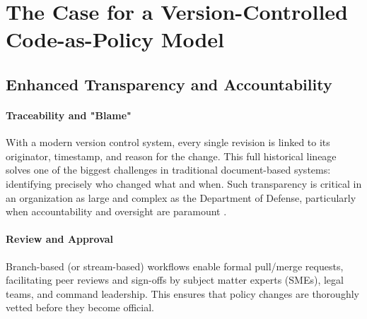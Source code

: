 \documentclass[11pt]{article}
\begin{document}
	\section{The Case for a Version-Controlled Code-as-Policy Model}

	\subsection{Enhanced Transparency and Accountability}

	\paragraph{Traceability and "Blame"}
	With a modern version control system, every single revision is linked to its originator, timestamp, and reason for the change. This full historical lineage solves one of the biggest challenges in traditional document-based systems: identifying precisely who changed what and when. Such transparency is critical in an organization as large and complex as the Department of Defense, particularly when accountability and oversight are paramount \cite{DoDDirective5100.01}.

	\paragraph{Review and Approval}
	Branch-based (or stream-based) workflows enable formal pull/merge requests, facilitating peer reviews and sign-offs by subject matter experts (SMEs), legal teams, and command leadership. This ensures that policy changes are thoroughly vetted before they become official.
\end{document}
